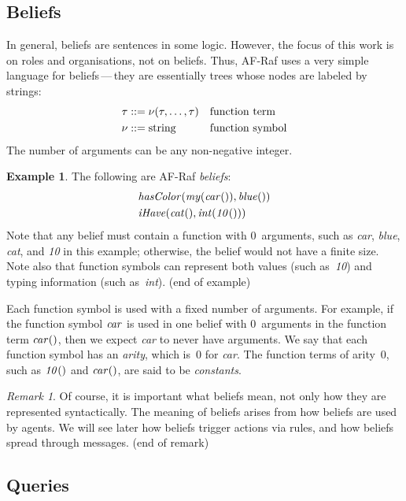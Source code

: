 \documentclass[a4paper,12pt,oneside,fleqn]{book} %
\theoremstyle{plain}
\theoremstyle{definition}
\newtheorem{example}{Example}
\theoremstyle{remark}
\newtheorem{remark}{Remark}
\newcommand{\eox}[1]{\hskip5mm\null\nobreak\hfill#1}
\newcommand{\eoe}{\eox{(end of example)}}
\newcommand{\eor}{\eox{(end of remark)}}
\begin{document}
\subsection{Beliefs}

In general, beliefs are sentences in some logic.  However, the focus of
this work is on roles and organisations, not on beliefs.  Thus, AF-Raf uses
a very simple language for beliefs\,---\,they are essentially trees whose
nodes are labeled by strings: \begin{align} \tau &::= \nu(\tau,\ldots,\tau)
&& \text{function term} \\ \nu  &::= {\rm string} &&\text{function symbol}
\end{align} The number of arguments can be any non-negative integer.

\begin{example} The following are AF-Raf \emph{beliefs}: \begin{align}
&{\it hasColor}({\it my}({\it car}()), {\it blue}()) \\ &{\it iHave}({\it
cat}(), {\it int}({\it 10}())) \end{align} Note that any belief must
contain a function with $0$~arguments, such as {\it car}, {\it blue}, {\it
cat}, and {\it 10\/} in this example; otherwise, the belief would not have
a finite size.  Note also that function symbols can represent both values
(such as~{\it 10\/}) and typing information (such as~{\it int\/}).  \eoe
\end{example}

Each function symbol is used with a fixed number of arguments.  For
example, if the function symbol ${\it car}$ is used in one belief with
$0$~arguments in the function term ${\it car}()$, then we expect {\it
car\/} to never have arguments.  We say that each function symbol has an
\emph{arity}, which is~$0$ for {\it car}.  The function terms of arity~$0$,
such as ${\it 10}()$ and ${\it car}()$, are said to be \emph{constants}.

\begin{remark} Of course, it is important what beliefs mean, not only how
they are represented syntactically.  The meaning of beliefs arises from how
beliefs are used by agents.  We will see later how beliefs trigger actions
via rules, and how beliefs spread through messages.  \eor \end{remark}

\subsection{Queries}
\end{document}
